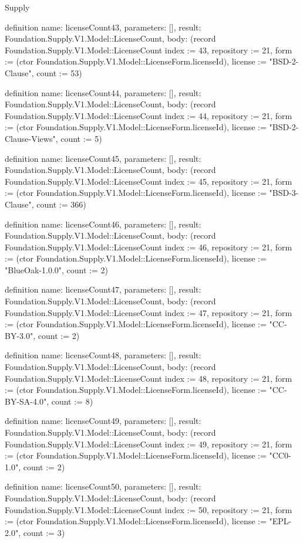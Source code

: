 \begin{lexlean}{Supply}
\begin{semanticmodule}
definition{
  name: licenseCount43,
  parameters: [],
  result: Foundation.Supply.V1.Model::LicenseCount,
  body: (record Foundation.Supply.V1.Model::LicenseCount {index := 43, repository := 21, form := (ctor Foundation.Supply.V1.Model::LicenseForm.licenseId), license := "BSD-2-Clause", count := 53})
}

definition{
  name: licenseCount44,
  parameters: [],
  result: Foundation.Supply.V1.Model::LicenseCount,
  body: (record Foundation.Supply.V1.Model::LicenseCount {index := 44, repository := 21, form := (ctor Foundation.Supply.V1.Model::LicenseForm.licenseId), license := "BSD-2-Clause-Views", count := 5})
}

definition{
  name: licenseCount45,
  parameters: [],
  result: Foundation.Supply.V1.Model::LicenseCount,
  body: (record Foundation.Supply.V1.Model::LicenseCount {index := 45, repository := 21, form := (ctor Foundation.Supply.V1.Model::LicenseForm.licenseId), license := "BSD-3-Clause", count := 366})
}

definition{
  name: licenseCount46,
  parameters: [],
  result: Foundation.Supply.V1.Model::LicenseCount,
  body: (record Foundation.Supply.V1.Model::LicenseCount {index := 46, repository := 21, form := (ctor Foundation.Supply.V1.Model::LicenseForm.licenseId), license := "BlueOak-1.0.0", count := 2})
}

definition{
  name: licenseCount47,
  parameters: [],
  result: Foundation.Supply.V1.Model::LicenseCount,
  body: (record Foundation.Supply.V1.Model::LicenseCount {index := 47, repository := 21, form := (ctor Foundation.Supply.V1.Model::LicenseForm.licenseId), license := "CC-BY-3.0", count := 2})
}

definition{
  name: licenseCount48,
  parameters: [],
  result: Foundation.Supply.V1.Model::LicenseCount,
  body: (record Foundation.Supply.V1.Model::LicenseCount {index := 48, repository := 21, form := (ctor Foundation.Supply.V1.Model::LicenseForm.licenseId), license := "CC-BY-SA-4.0", count := 8})
}

definition{
  name: licenseCount49,
  parameters: [],
  result: Foundation.Supply.V1.Model::LicenseCount,
  body: (record Foundation.Supply.V1.Model::LicenseCount {index := 49, repository := 21, form := (ctor Foundation.Supply.V1.Model::LicenseForm.licenseId), license := "CC0-1.0", count := 2})
}

definition{
  name: licenseCount50,
  parameters: [],
  result: Foundation.Supply.V1.Model::LicenseCount,
  body: (record Foundation.Supply.V1.Model::LicenseCount {index := 50, repository := 21, form := (ctor Foundation.Supply.V1.Model::LicenseForm.licenseId), license := "EPL-2.0", count := 3})
}


\end{semanticmodule}
\end{lexlean}
